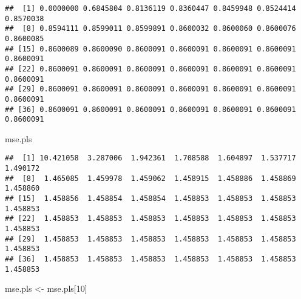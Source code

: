 \documentclass[
]{article}
\newenvironment{Shaded}{\begin{snugshade}}{\end{snugshade}}
\newcommand{\AttributeTok}[1]{\textcolor[rgb]{0.77,0.63,0.00}{#1}}
\newcommand{\DecValTok}[1]{\textcolor[rgb]{0.00,0.00,0.81}{#1}}
\newcommand{\FunctionTok}[1]{\textcolor[rgb]{0.00,0.00,0.00}{#1}}
\newcommand{\NormalTok}[1]{#1}
\newcommand{\OtherTok}[1]{\textcolor[rgb]{0.56,0.35,0.01}{#1}}
\newcommand{\SpecialCharTok}[1]{\textcolor[rgb]{0.00,0.00,0.00}{#1}}
\newcommand{\StringTok}[1]{\textcolor[rgb]{0.31,0.60,0.02}{#1}}
\begin{document}
\begin{Shaded}
\end{Shaded}

\begin{verbatim}
##  [1] 0.0000000 0.6845804 0.8136119 0.8360447 0.8459948 0.8524414 0.8570038
##  [8] 0.8594111 0.8599011 0.8599891 0.8600032 0.8600060 0.8600076 0.8600085
## [15] 0.8600089 0.8600090 0.8600091 0.8600091 0.8600091 0.8600091 0.8600091
## [22] 0.8600091 0.8600091 0.8600091 0.8600091 0.8600091 0.8600091 0.8600091
## [29] 0.8600091 0.8600091 0.8600091 0.8600091 0.8600091 0.8600091 0.8600091
## [36] 0.8600091 0.8600091 0.8600091 0.8600091 0.8600091 0.8600091 0.8600091
\end{verbatim}

\begin{Shaded}
\begin{Highlighting}[]
\NormalTok{mse.pls}
\end{Highlighting}
\end{Shaded}

\begin{verbatim}
##  [1] 10.421058  3.287006  1.942361  1.708588  1.604897  1.537717  1.490172
##  [8]  1.465085  1.459978  1.459062  1.458915  1.458886  1.458869  1.458860
## [15]  1.458856  1.458854  1.458854  1.458853  1.458853  1.458853  1.458853
## [22]  1.458853  1.458853  1.458853  1.458853  1.458853  1.458853  1.458853
## [29]  1.458853  1.458853  1.458853  1.458853  1.458853  1.458853  1.458853
## [36]  1.458853  1.458853  1.458853  1.458853  1.458853  1.458853  1.458853
\end{verbatim}

\begin{Shaded}
\begin{Highlighting}[]
\NormalTok{mse.pls }\OtherTok{\textless{}{-}}\NormalTok{ mse.pls[}\DecValTok{10}\NormalTok{]}
\end{Highlighting}
\end{Shaded}
\end{document}
